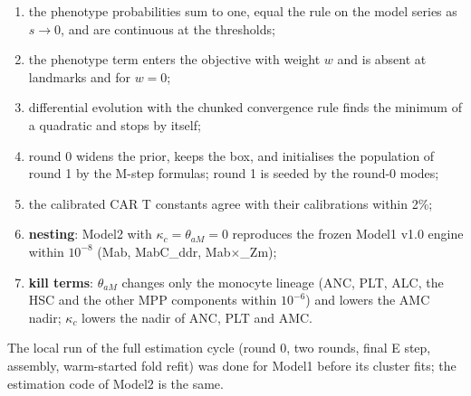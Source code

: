 \documentclass[11pt]{article}
\begin{document}
\begin{enumerate}
\item the phenotype probabilities sum to one, equal the rule on the model series as $s\to0$, and are continuous at the thresholds;
\item the phenotype term enters the objective with weight $w$ and is absent at landmarks and for $w=0$;
\item differential evolution with the chunked convergence rule finds the minimum of a quadratic and stops by itself;
\item round 0 widens the prior, keeps the box, and initialises the population of round 1 by the M-step formulas; round 1 is seeded by the round-0 modes;
\item the calibrated CAR T constants agree with their calibrations within 2\%;
\item \textbf{nesting}: Model2 with $\kappa_c=\theta_{aM}=0$ reproduces the frozen Model1 v1.0 engine within $10^{-8}$ (Mab, MabC\_ddr, Mab$\times$\_Zm);
\item \textbf{kill terms}: $\theta_{aM}$ changes only the monocyte lineage (ANC, PLT, ALC, the HSC and the other MPP components within $10^{-6}$) and lowers the AMC nadir; $\kappa_c$ lowers the nadir of ANC, PLT and AMC.
\end{enumerate}
The local run of the full estimation cycle (round 0, two rounds, final E step, assembly, warm-started fold refit) was done for Model1 before its cluster fits; the estimation code of Model2 is the same.
\end{document}

